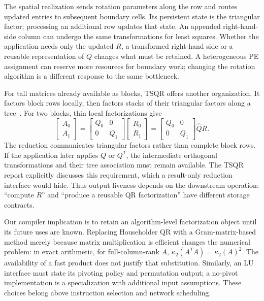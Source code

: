 \documentclass[final,3p,times,authoryear]{elsarticle}
\newcommand{\R}{\mathbb{R}}
\begin{document}
The spatial realization sends rotation parameters along the row and routes updated entries to subsequent boundary cells. Its persistent state is the triangular factor; processing an additional row updates that state. An appended right-hand-side column can undergo the same transformations for least squares. Whether the application needs only the updated $R$, a transformed right-hand side or a reusable representation of $Q$ changes what must be retained. A heterogeneous PE assignment can reserve more resources for boundary work; changing the rotation algorithm is a different response to the same bottleneck.

For tall matrices already available as blocks, TSQR offers another organization. It factors block rows locally, then factors stacks of their triangular factors along a tree~\citep{demmel2008}. For two blocks, thin local factorizations give
\begin{equation}
 \begin{bmatrix}A_0\\A_1\end{bmatrix}
 =\begin{bmatrix}Q_0&0\\0&Q_1\end{bmatrix}
  \begin{bmatrix}R_0\\R_1\end{bmatrix}
 =\begin{bmatrix}Q_0&0\\0&Q_1\end{bmatrix}\widehat Q R.
\end{equation}
The reduction communicates triangular factors rather than complete block rows. If the application later applies $Q$ or $Q^T$, the intermediate orthogonal transformations and their tree association must remain available. The TSQR report explicitly discusses this requirement, which a result-only reduction interface would hide. Thus output liveness depends on the downstream operation: ``compute $R$'' and ``produce a reusable QR factorization'' have different storage contracts.

Our compiler implication is to retain an algorithm-level factorization object until its future uses are known. Replacing Householder QR with a Gram-matrix-based method merely because matrix multiplication is efficient changes the numerical problem: in exact arithmetic, for full-column-rank $A$, $\kappa_2(A^TA)=\kappa_2(A)^2$. The availability of a fast product does not justify that substitution. Similarly, an LU interface must state its pivoting policy and permutation output; a no-pivot implementation is a specialization with additional input assumptions. These choices belong above instruction selection and network scheduling.
\end{document}
